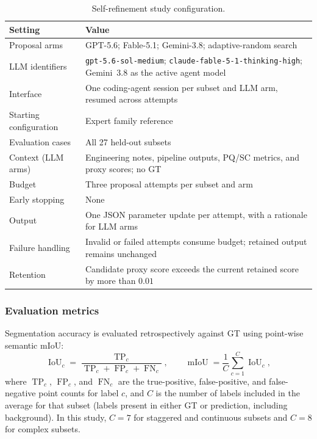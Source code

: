 \documentclass[a4paper,fleqn]{cas-dc}
\begin{document}
{\begin{table}[ht]
\caption{Self-refinement study configuration.}
\label{tab:poc-config}
\centering
\begin{tabular}{p{} p{}}
\toprule
Setting & Value \\
\midrule
Proposal arms & GPT-5.6; Fable-5.1; Gemini-3.8; adaptive-random search \\
LLM identifiers & \texttt{gpt-5.6-sol-medium}; \texttt{claude-fable-5-1-thinking-high}; Gemini~3.8 as the active agent model \\
Interface & One coding-agent session per subset and LLM arm, resumed across attempts \\
Starting configuration & Expert family reference \\
Evaluation cases & All 27 held-out subsets \\
Context (LLM arms) & Engineering notes, pipeline outputs, PQ/SC metrics, and proxy scores; no GT \\
Budget & Three proposal attempts per subset and arm \\
Early stopping & None \\
Output & One JSON parameter update per attempt, with a rationale for LLM arms \\
Failure handling & Invalid or failed attempts consume budget; retained output remains unchanged \\
Retention & Candidate proxy score exceeds the current retained score by more than $0.01$ \\
\bottomrule
\end{tabular}
\end{table}


\subsubsection{Evaluation metrics}
\label{sec:metrics}

Segmentation accuracy is evaluated retrospectively against GT using point-wise semantic mIoU:
\begin{equation}
\operatorname{IoU}_c
=
\frac{\operatorname{TP}_c}
{\operatorname{TP}_c+\operatorname{FP}_c+\operatorname{FN}_c},
\qquad
\operatorname{mIoU}
=
\frac{1}{C}\sum_{c=1}^{C}\operatorname{IoU}_c,
\end{equation}
where $\operatorname{TP}_c$, $\operatorname{FP}_c$, and $\operatorname{FN}_c$ are the true-positive, false-positive, and false-negative point counts for label $c$, and $C$ is the number of labels included in the average for that subset (labels present in either GT or prediction, including background). In this study, $C=7$ for staggered and continuous subsets and $C=8$ for complex subsets.

}
\end{document}
